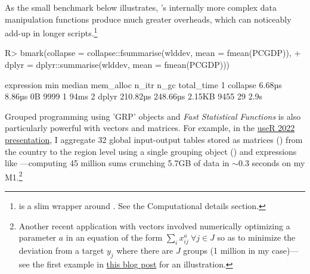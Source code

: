 \documentclass[nojss]{jss} %
\newcommand{\fct}[1]{\code{#1()}}
\begin{document}
As the small benchmark below illustrates, 's internally more complex data manipulation functions produce much greater overheads, which can noticeably add-up in longer scripts.\footnote{\fct{bmark} is a slim wrapper around \fct{bench::mark}. See the Computational details section.}
%
\begin{Schunk}
\begin{Sinput}
R> bmark(collapse = collapse::fsummarise(wlddev, mean = fmean(PCGDP)),
+        dplyr = dplyr::summarise(wlddev, mean = fmean(PCGDP)))
\end{Sinput}
\begin{Soutput}
  expression      min   median mem_alloc n_itr n_gc total_time
1   collapse   6.68µs   8.86µs        0B  9999    1       94ms
2      dplyr 210.82µs 248.66µs    2.15KB  9455   29       2.9s
\end{Soutput}
\end{Schunk}
%
Grouped programming using 'GRP' objects and \emph{Fast Statistical Functions} is also particularly powerful with vectors and matrices. For example, in the \href{https://raw.githubusercontent.com/SebKrantz/collapse/master/misc/useR2022\%20presentation/collapse_useR2022_final.pdf}{useR 2022 presentation}, I aggregate 32 global input-output tables stored as matrices () from the country to the region level using a single grouping object () and expressions like ---computing 45 million sums crunching 5.7GB of data in $\sim$0.3 seconds on my M1.\footnote{Another recent application with vectors involved numerically optimizing a parameter $a$ in an equation of the form $\sum_i x_{ij}^a\ \forall j\in J$ so as to minimize the deviation from a target $y_j$ where there are $J$ groups (1 million in my case)---see the first example in \href{https://sebkrantz.github.io/Rblog/2023/04/12/collapse-and-the-fastverse-reflecting-the-past-present-and-future/}{this blog post} for an illustration.}
%
\newpage
%
\end{document}
